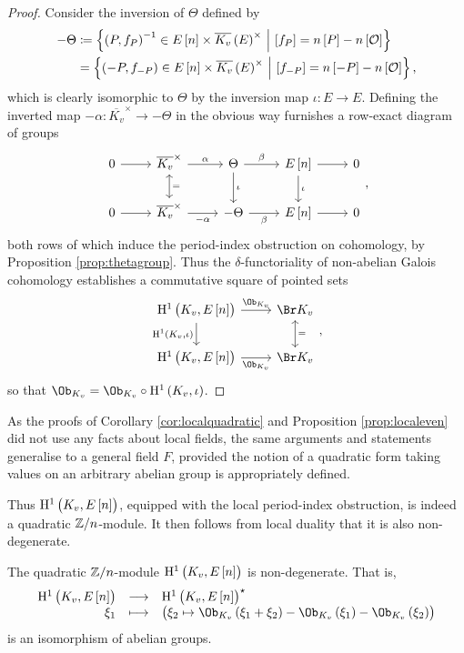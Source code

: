 \begin{proof}
Consider the inversion of $ \Theta $ defined by
\begin{align*}
-\Theta
& \coloneqq \cbr{\br{P, f_P}^{-1} \in E\sbr{n} \times \overline{K_v}\br{E}^\times \st \sbr{f_P} = n\sbr{P} - n\sbr{\OOO}} \\
& = \cbr{\br{-P, f_{-P}} \in E\sbr{n} \times \overline{K_v}\br{E}^\times \st \sbr{f_{-P}} = n\sbr{-P} - n\sbr{\OOO}},
\end{align*}
which is clearly isomorphic to $ \Theta $ by the inversion map $ \iota : E \to E $. Defining the inverted map $ -\alpha : \overline{K_v}^\times \to -\Theta $ in the obvious way furnishes a row-exact diagram of groups
$$
\begin{tikzcd}
0 \arrow{r} & \overline{K_v}^\times \arrow{r}{\alpha} \arrow[leftrightarrow]{d}{=} & \Theta \arrow{r}{\beta} \arrow{d}{\iota} & E\sbr{n} \arrow{r} \arrow{d}{\iota} & 0 \\
0 \arrow{r} & \overline{K_v}^\times \arrow{r}[swap]{-\alpha} & -\Theta \arrow{r}[swap]{\beta} & E\sbr{n} \arrow{r} & 0
\end{tikzcd},
$$
both rows of which induce the period-index obstruction on cohomology, by Proposition \ref{prop:thetagroup}. Thus the $ \delta $-functoriality of non-abelian Galois cohomology establishes a commutative square of pointed sets
$$
\begin{tikzcd}
\HE[n]{K_v} \arrow{r}{\Ob_{K_v}} \arrow[swap]{d}{\H^1\br{K_v, \iota}} & \Br K_v \arrow[leftrightarrow]{d}{=} \\
\HE[n]{K_v} \arrow[swap]{r}{\Ob_{K_v}} & \Br K_v
\end{tikzcd},
$$
so that $ \Ob_{K_v} = \Ob_{K_v} \circ \H^1\br{K_v, \iota} $.
\end{proof}

\begin{remark}
As the proofs of Corollary \ref{cor:localquadratic} and Proposition \ref{prop:localeven} did not use any facts about local fields, the same arguments and statements generalise to a general field $ F $, provided the notion of a quadratic form taking values on an arbitrary abelian group is appropriately defined.
\end{remark}

Thus $ \HE[n]{K_v} $, equipped with the local period-index obstruction, is indeed a quadratic $ \mathbb{Z} / n $-module. It then follows from local duality that it is also non-degenerate.

\begin{corollary}
\label{cor:localnondegenerate}
The quadratic $ \mathbb{Z} / n $-module $ \HE[n]{K_v} $ is non-degenerate. That is,
$$ \function{\HE[n]{K_v}}{\HE[n]{K_v}^\star}{\xi_1}{\br{\xi_2 \mapsto \Ob_{K_v}\br{\xi_1 + \xi_2} - \Ob_{K_v}\br{\xi_1} - \Ob_{K_v}\br{\xi_2}}} $$
is an isomorphism of abelian groups.
\end{corollary}

